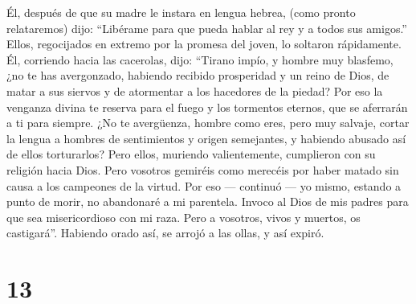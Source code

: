  Él, después de que su madre le instara en lengua hebrea,
(como pronto relataremos) dijo:  ``Libérame para que pueda
hablar al rey y a todos sus amigos.''  Ellos, regocijados
en extremo por la promesa del joven, lo soltaron rápidamente.
 Él, corriendo hacia las cacerolas, dijo: 
``Tirano impío, y hombre muy blasfemo, ¿no te has avergonzado, habiendo
recibido prosperidad y un reino de Dios, de matar a sus siervos y de
atormentar a los hacedores de la piedad?  Por eso la
venganza divina te reserva para el fuego y los tormentos eternos, que se
aferrarán a ti para siempre.  ¿No te avergüenza, hombre
como eres, pero muy salvaje, cortar la lengua a hombres de sentimientos
y origen semejantes, y habiendo abusado así de ellos torturarlos?
 Pero ellos, muriendo valientemente, cumplieron con su
religión hacia Dios.  Pero vosotros gemiréis como
merecéis por haber matado sin causa a los campeones de la virtud.
 Por eso --- continuó --- yo mismo, estando a punto de
morir,  no abandonaré a mi parentela. 
Invoco al Dios de mis padres para que sea misericordioso con mi raza.
 Pero a vosotros, vivos y muertos, os castigará''.
 Habiendo orado así, se arrojó a las ollas, y así expiró.

\hypertarget{section-12}{%
\section{13}\label{section-12}}

